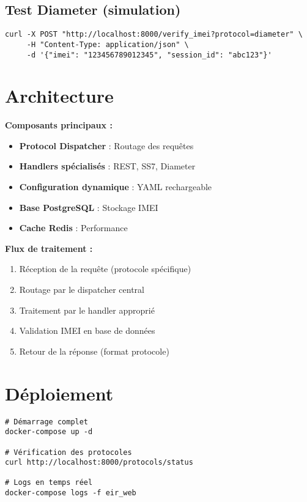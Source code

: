 \documentclass[11pt]{article}
\begin{document}
\subsection{Test Diameter (simulation)}
\begin{lstlisting}[caption=Requête Diameter]
curl -X POST "http://localhost:8000/verify_imei?protocol=diameter" \
     -H "Content-Type: application/json" \
     -d '{"imei": "123456789012345", "session_id": "abc123"}'
\end{lstlisting}

\section{Architecture}

\textbf{Composants principaux :}
\begin{itemize}
    \item \textbf{Protocol Dispatcher} : Routage des requêtes
    \item \textbf{Handlers spécialisés} : REST, SS7, Diameter
    \item \textbf{Configuration dynamique} : YAML rechargeable
    \item \textbf{Base PostgreSQL} : Stockage IMEI
    \item \textbf{Cache Redis} : Performance
\end{itemize}

\textbf{Flux de traitement :}
\begin{enumerate}
    \item Réception de la requête (protocole spécifique)
    \item Routage par le dispatcher central
    \item Traitement par le handler approprié
    \item Validation IMEI en base de données
    \item Retour de la réponse (format protocole)
\end{enumerate}

\section{Déploiement}

\begin{lstlisting}[caption=Docker Compose]
# Démarrage complet
docker-compose up -d

# Vérification des protocoles
curl http://localhost:8000/protocols/status

# Logs en temps réel
docker-compose logs -f eir_web
\end{lstlisting}
\end{document}
